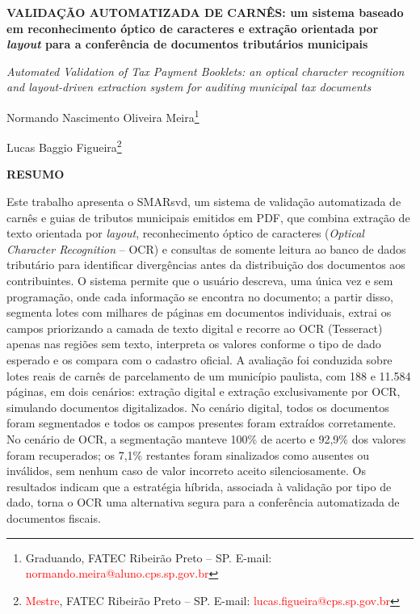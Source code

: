 \documentclass[article,12pt,oneside,a4paper,english,brazil]{abntex2}
\newcommand{\pendente}[1]{\textcolor{red}{#1}}
\begin{document}
\frenchspacing

\begin{center}
\textbf{VALIDAÇÃO AUTOMATIZADA DE CARNÊS: um sistema baseado em reconhecimento óptico
de caracteres e extração orientada por \textit{layout} para a conferência de documentos
tributários municipais}

\vspace{0.4cm}
\textit{Automated Validation of Tax Payment Booklets: an optical character recognition
and layout-driven extraction system for auditing municipal tax documents}

\vspace{0.6cm}
Normando Nascimento Oliveira Meira\footnote{Graduando, FATEC Ribeirão Preto -- SP.
E-mail: \pendente{normando.meira@aluno.cps.sp.gov.br}}

Lucas Baggio Figueira\footnote{\pendente{Mestre}, FATEC Ribeirão Preto -- SP.
E-mail: \pendente{lucas.figueira@cps.sp.gov.br}}
\end{center}

\vspace{0.4cm}
\noindent\textbf{RESUMO}\par
\noindent Este trabalho apresenta o SMARsvd, um sistema de validação automatizada de carnês
e guias de tributos municipais emitidos em PDF, que combina extração de texto
orientada por \textit{layout}, reconhecimento óptico de caracteres (\textit{Optical
Character Recognition} -- OCR) e consultas de somente leitura ao banco de dados
tributário para identificar divergências antes da distribuição dos documentos aos
contribuintes. O sistema permite que o usuário descreva, uma única vez e sem
programação, onde cada informação se encontra no documento; a partir disso,
segmenta lotes com milhares de páginas em documentos individuais, extrai os campos
priorizando a camada de texto digital e recorre ao OCR (Tesseract) apenas nas regiões
sem texto, interpreta os valores conforme o tipo de dado esperado e os compara com o
cadastro oficial. A avaliação foi conduzida sobre lotes reais de carnês de
parcelamento de um município paulista, com 188 e 11.584 páginas, em dois cenários:
extração digital e extração exclusivamente por OCR, simulando documentos digitalizados.
No cenário digital, todos os documentos foram segmentados e todos os campos presentes
foram extraídos corretamente. No cenário de OCR, a segmentação manteve 100\% de acerto
e 92,9\% dos valores foram recuperados; os 7,1\% restantes foram sinalizados como
ausentes ou inválidos, sem nenhum caso de valor incorreto aceito silenciosamente.
Os resultados indicam que a estratégia híbrida, associada à validação por tipo de dado,
torna o OCR uma alternativa segura para a conferência automatizada de documentos
fiscais.
\end{document}
